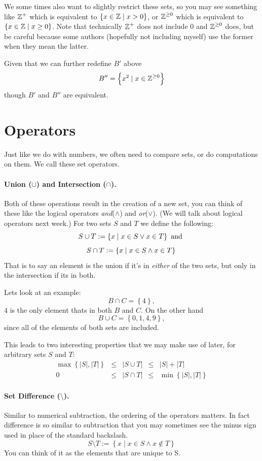 We some times also want to slightly restrict these sets, so you may see something like $\operatorname{\mathbb{Z}}^+$ which is equivalent to $\{x \in \operatorname{\mathbb{Z}} \mid x > 0\}$, 
or $\operatorname{\mathbb{Z}}^{\ge0}$ which is equivalent to $\{x \in \operatorname{\mathbb{Z}} \mid x \ge 0\}$.
Note that technically $\operatorname{\mathbb{Z}}^+$ does not include 0 and $\operatorname{\mathbb{Z}}^{\ge0}$ does, 
but be careful because some authors (hopefully not including myself) use the former when they mean the latter. 

Given that we can further redefine $B'$ above 
\[
B'' = \left\{x^2 \mid x \in \operatorname{\mathbb{Z}}^{\ge0} \right\}
\]
 though $B'$ and $B''$ are equivalent. 
 
\section{Operators}

Just like we do with numbers, we often need to compare sets, or do computations on them.
We call these set operators. 

\paragraph{Union ($\cup$) and Intersection ($\cap$).}
Both of these operations result in the creation of a new set, 
you can think of these like the logical operators \textit{and}($\wedge$) and \textit{or}($\vee$). (We will talk about logical operators next week.)
For two sets $S$ and $T$ we define the following: 
\[
S\cup T := \left\{x \mid x \in S \vee x \in T\right\} \textnormal{ and }
\]\[
S\cap T := \left\{x \mid x \in S \wedge x \in T\right\} \\
\]
That is to say an element is the union if it's in \textit{either} of the two sets, but only in the intersection if its in both. 

Lets look at an example:
\[
B \cap C = \left\{4\right\},
\]
$4$ is the only element thats in both $B$ and $C$. 
On the other hand 
\[
B \cup C = \left\{0,1,4,9\right\},
\]
since all of the elements of both sets are included. 

This leads to two interesting properties that we may make use of later, for arbitrary sets $S$ and $T$: 
\[
\begin{matrix}
\max\left\{|S|, |T|\right\} &\le& |S\cup T| &\le&  |S| + |T|\\
0 &\le& |S\cap T| &\le& \min\left\{|S|, |T|\right\}
\end{matrix}
\]
\paragraph{Set Difference ($\setminus$).}
Similar to numerical subtraction, the ordering of the operators matters. 
In fact difference is so similar to subtraction that you may sometimes see the minus sign used in place of the standard backslash. 
\[
S\setminus T  := \left\{x \mid x \in S \wedge x \notin T\right\} 
\]
You can think of it as the elements that are unique to S. 

